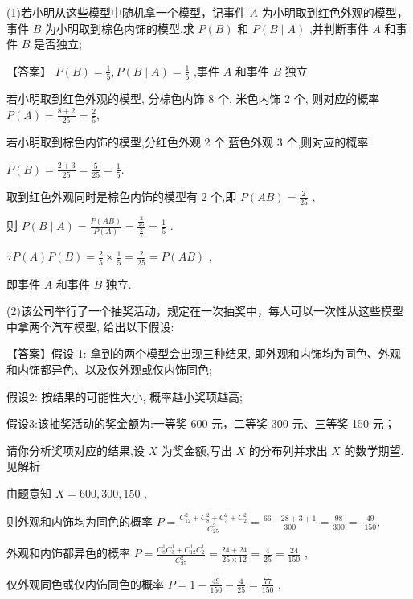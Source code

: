 \documentclass[10pt]{article}
\begin{document}
(1)若小明从这些模型中随机拿一个模型，记事件 \(A\) 为小明取到红色外观的模型，事件 \(B\) 为小明取到棕色内饰的模型,求 \(P\left( B\right)\) 和 \(P\left( {B \mid  A}\right)\) ,并判断事件 \(A\) 和事件 \(B\) 是否独立;

【答案】 \(P\left( B\right)  = \frac{1}{5},P\left( {B \mid  A}\right)  = \frac{1}{5}\) ,事件 \(A\) 和事件 \(B\) 独立

若小明取到红色外观的模型, 分棕色内饰 8 个, 米色内饰 2 个, 则对应的概率 \(P\left( A\right)  = \frac{8 + 2}{25} = \frac{2}{5},\)

若小明取到棕色内饰的模型,分红色外观 2 个,蓝色外观 3 个,则对应的概率

\(P\left( B\right)  = \frac{2 + 3}{25} = \frac{5}{25} = \frac{1}{5}.\)

取到红色外观同时是棕色内饰的模型有 2 个,即 \(P\left( {AB}\right)  = \frac{2}{25}\) ,

则 \(P\left( {B \mid  A}\right)  = \frac{P\left( {AB}\right) }{P\left( A\right) } = \frac{\frac{2}{25}}{\frac{2}{5}} = \frac{1}{5}\) .

\(\because P\left( A\right) P\left( B\right)  = \frac{2}{5} \times  \frac{1}{5} = \frac{2}{25} = P\left( {AB}\right)\) ,

即事件 \(A\) 和事件 \(B\) 独立.

(2)该公司举行了一个抽奖活动，规定在一次抽奖中，每人可以一次性从这些模型中拿两个汽车模型, 给出以下假设:

【答案】假设 1: 拿到的两个模型会出现三种结果, 即外观和内饰均为同色、外观和内饰都异色、以及仅外观或仅内饰同色;

假设2: 按结果的可能性大小, 概率越小奖项越高;

假设3:该抽奖活动的奖金额为:一等奖 600 元，二等奖 300 元、三等奖 150 元；

请你分析奖项对应的结果,设 \(X\) 为奖金额,写出 \(X\) 的分布列并求出 \(X\) 的数学期望. 见解析

由题意知 \(X = {600},{300},{150}\) ,

则外观和内饰均为同色的概率 \(P = \frac{{C}_{12}^{2} + {C}_{8}^{2} + {C}_{3}^{2} + {C}_{2}^{2}}{{C}_{25}^{2}} = \frac{{66} + {28} + 3 + 1}{300} = \frac{98}{300} = \; \frac{49}{150},\)

外观和内饰都异色的概率 \(P = \frac{{C}_{8}^{1}{C}_{3}^{1} + {C}_{12}^{1}{C}_{2}^{1}}{{C}_{25}^{2}} = \frac{{24} + {24}}{{25} \times  {12}} = \frac{4}{25} = \frac{24}{150}\) ,

仅外观同色或仅内饰同色的概率 \(P = 1 - \frac{49}{150} - \frac{4}{25} = \frac{77}{150}\) ,
\end{document}

